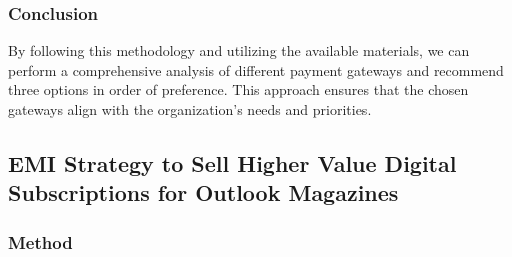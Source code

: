 \subsubsection{Conclusion}
By following this methodology and utilizing the available materials, we can perform a comprehensive analysis of different payment gateways and recommend three options in order of preference. This approach ensures that the chosen gateways align with the organization's needs and priorities.

\subsection{EMI Strategy to Sell Higher Value Digital Subscriptions for Outlook Magazines}

\subsubsection{Method}

